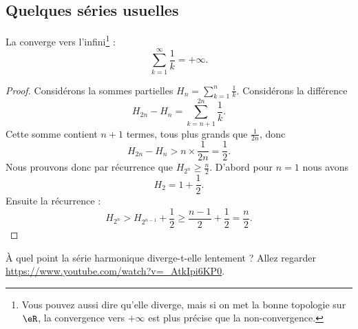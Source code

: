 \subsection{Quelques séries usuelles}
\label{SUBSECooDTYHooZjXXJf}

\begin{proposition}       \label{PROPooBAIWooKxMLvh}
	La  converge vers l'infini\footnote{Vous pouvez aussi dire qu'elle diverge, mais si on met la bonne topologie sur \( \eR\), la convergence vers \( +\infty\) est plus précise que la non-convergence.} :
	\begin{equation}
		\sum_{k=1}^\infty \frac{1}{ k }=+\infty.
	\end{equation}
\end{proposition}

\begin{proof}
	Considérons la sommes partielles \( H_n=\sum_{k=1}^n\frac{1}{ k }\). Considérons la différence
	\begin{equation}
		H_{2n}-H_n=\sum_{k=n+1}^{2n}\frac{1}{ k }.
	\end{equation}
	Cette somme contient \( n+1\) termes, tous plus grands que \( \frac{1}{ 2n }\), donc
	\begin{equation}
		H_{2n}-H_n > n\times\frac{1}{ 2n }=\frac{ 1 }{2}.
	\end{equation}
	Nous prouvons donc par récurrence que \( H_{2^n}\geq \frac{ n }{2}\). D'abord pour \( n=1\) nous avons
	\begin{equation}
		H_2=1+\frac{ 1 }{2}.
	\end{equation}
	Ensuite la récurrence :
	\begin{equation}
		H_{2^n}>H_{2^{n-1}}+\frac{ 1 }{2}\geq \frac{ n-1 }{ 2 }+\frac{ 1 }{2}=\frac{ n }{2}.
	\end{equation}
\end{proof}

\begin{normaltext}
	À quel point la série harmonique diverge-t-elle lentement ? Allez regarder\\ \url{https://www.youtube.com/watch?v=_AtkIpi6KP0}.
\end{normaltext}

